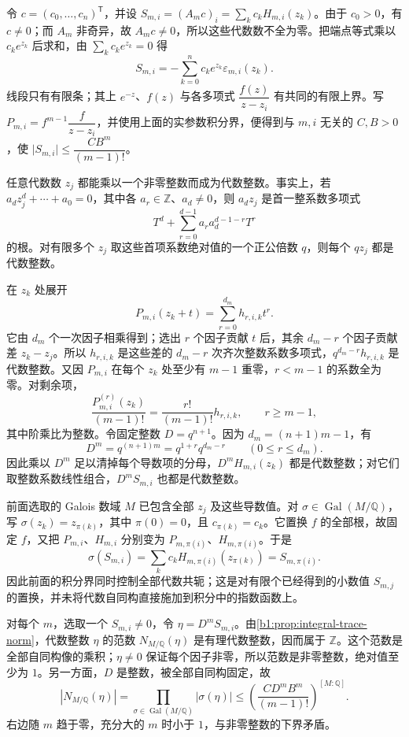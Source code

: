 \begin{proofsketch}
	令 \(c=(c_0,\ldots,c_n)^{\mathsf T}\)，并设 \(S_{m,i}=(A_mc)_i=\sum_k c_kH_{m,i}(z_k)\)。由于 \(c_0>0\)，有 \(c\ne0\)；而 \(A_m\) 非奇异，故 \(A_mc\ne0\)，所以这些代数数不全为零。把端点等式乘以 \(c_ke^{z_k}\) 后求和，由 \(\sum_k c_ke^{z_k}=0\) 得
	\[
		S_{m,i}=-\sum_{k=0}^n c_ke^{z_k}\varepsilon_{m,i}(z_k).
	\]
	线段只有有限条；其上 \(e^{-z}\)、\(f(z)\) 与各多项式 \(\dfrac{f(z)}{z-z_i}\) 有共同的有限上界。写 \(P_{m,i}=f^{m-1}\dfrac{f}{z-z_i}\)，并使用上面的实参数积分界，便得到与 \(m,i\) 无关的 \(C,B>0\)，使 \(\lvert S_{m,i}\rvert\le\dfrac{CB^m}{(m-1)!}\)。

	任意代数数 \(z_j\) 都能乘以一个非零整数而成为代数整数。事实上，若 \(a_dz_j^d+\cdots+a_0=0\)，其中各 \(a_r\in\mathbb Z\)、\(a_d\ne0\)，则 \(a_dz_j\) 是首一整系数多项式
	\[
		T^d+\sum_{r=0}^{d-1}a_r a_d^{d-1-r}T^r
	\]
	的根。对有限多个 \(z_j\) 取这些首项系数绝对值的一个正公倍数 \(q\)，则每个 \(qz_j\) 都是代数整数。

	在 \(z_k\) 处展开
	\[
		P_{m,i}(z_k+t)=\sum_{r=0}^{d_m}h_{r,i,k}t^r.
	\]
	它由 \(d_m\) 个一次因子相乘得到；选出 \(r\) 个因子贡献 \(t\) 后，其余 \(d_m-r\) 个因子贡献差 \(z_k-z_j\)。所以 \(h_{r,i,k}\) 是这些差的 \(d_m-r\) 次齐次整数系数多项式，\(q^{d_m-r}h_{r,i,k}\) 是代数整数。又因 \(P_{m,i}\) 在每个 \(z_k\) 处至少有 \(m-1\) 重零，\(r<m-1\) 的系数全为零。对剩余项，
	\[
		\frac{P_{m,i}^{(r)}(z_k)}{(m-1)!} =\frac{r!}{(m-1)!}h_{r,i,k}, \qquad r\ge m-1,
	\]
	其中阶乘比为整数。令固定整数 \(D=q^{n+1}\)。因为 \(d_m=(n+1)m-1\)，有
	\[
		D^m=q^{(n+1)m}=q^{1+r}q^{d_m-r} \qquad(0\le r\le d_m).
	\]
	因此乘以 \(D^m\) 足以清掉每个导数项的分母，\(D^mH_{m,i}(z_k)\) 都是代数整数；对它们取整数系数线性组合，\(D^mS_{m,i}\) 也都是代数整数。

	前面选取的 Galois 数域 \(M\) 已包含全部 \(z_j\) 及这些导数值。对 \(\sigma\in\operatorname{Gal}(M/\mathbb Q)\)，写 \(\sigma(z_k)=z_{\pi(k)}\)，其中 \(\pi(0)=0\)，且 \(c_{\pi(k)}=c_k\)。它置换 \(f\) 的全部根，故固定 \(f\)，又把 \(P_{m,i}\)、\(H_{m,i}\) 分别变为 \(P_{m,\pi(i)}\)、\(H_{m,\pi(i)}\)。于是
	\[
		\sigma(S_{m,i}) =\sum_k c_kH_{m,\pi(i)}(z_{\pi(k)}) =S_{m,\pi(i)}.
	\]
	因此前面的积分界同时控制全部代数共轭；这是对有限个已经得到的小数值 \(S_{m,j}\) 的置换，并未将代数自同构直接施加到积分中的指数函数上。

	对每个 \(m\)，选取一个 \(S_{m,i}\ne0\)，令 \(\eta=D^mS_{m,i}\)。由\cref{b1:prop:integral-trace-norm}，代数整数 \(\eta\) 的范数 \(N_{M/\mathbb Q}(\eta)\) 是有理代数整数，因而属于 \(\mathbb Z\)。这个范数是全部自同构像的乘积；\(\eta\ne0\) 保证每个因子非零，所以范数是非零整数，绝对值至少为 \(1\)。另一方面，\(D\) 是整数，被全部自同构固定，故
	\[
		\left|N_{M/\mathbb Q}(\eta)\right| =\prod_{\sigma\in\operatorname{Gal}(M/\mathbb Q)}|\sigma(\eta)| \le\left(\frac{CD^mB^m}{(m-1)!}\right)^{[M:\mathbb Q]}.
	\]
	右边随 \(m\) 趋于零，充分大的 \(m\) 时小于 \(1\)，与非零整数的下界矛盾。


\end{proofsketch}
